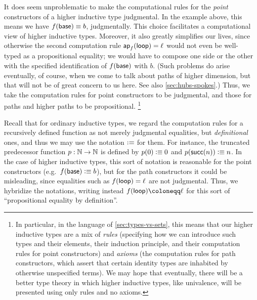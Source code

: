 It does seem unproblematic to make the computational rules for the \emph{point} constructors of a higher inductive type judgmental.
In the example above, this means we have $f(\mathsf{base})\equiv b$, judgmentally.
This choice facilitates a computational view of higher inductive types.
Moreover, it also greatly simplifies our lives, since otherwise the second computation rule $\mathsf{ap}_{f} (\mathsf{loop}) = \ell$ would not even be well-typed as a propositional equality; we would have to compose one side or the other with the specified identification of $f(\mathsf{base})$ with $b$.
(Such problems do arise eventually, of course, when we come to talk about paths of higher dimension, but that will not be of great concern to us here.
See also \autoref{sec:hubs-spokes}.)
Thus, we take the computation rules for point constructors to be judgmental, and those for paths and higher paths to be propositional.%
\footnote{In particular, in the language of \autoref{sec:types-vs-sets}, this means that our higher inductive types are a mix of \emph{rules} (specifying how we can introduce such types and their elements, their induction principle, and their computation rules for point constructors) and \emph{axioms} (the computation rules for path constructors, which assert that certain identity types are inhabited by otherwise unspecified terms).
We may hope that eventually, there will be a better type theory in which higher inductive types, like univalence, will be presented using only rules and no axioms.%
%
%
}

\begin{rmk}\label{rmk:defid}
Recall that for ordinary inductive types, we regard the computation rules for a recursively defined function as not merely judgmental equalities, but \emph{definitional} ones, and thus we may use the notation $\vcentcolon\equiv$ for them.
For instance, the truncated predecessor function $p:\mathbb{N}\to\mathbb{N}$ is defined by $p(0)\vcentcolon\equiv 0$ and $p(\mathsf{succ}(n))\vcentcolon\equiv n$.
In the case of higher inductive types, this sort of notation is reasonable for the point constructors (e.g.\ $f(\mathsf{base})\vcentcolon\equiv b$), but for the path constructors it could be misleading, since equalities such as ${f}\mathopen{}\left({\mathsf{loop}}\right)\mathclose{} = \ell$ are not judgmental.
Thus, we hybridize the notations, writing instead $\ap f \lloop \defid \ell$ for this sort of ``propositional equality by definition''.
\end{rmk}
%
%


